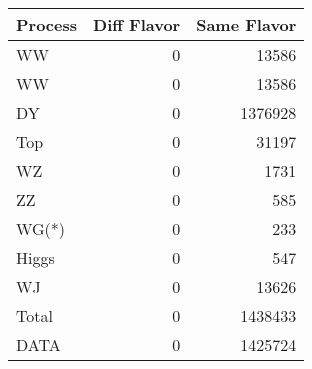 \begin{table}[ht]
	\centering
\begin{tabular}{lrr}

Process &  Diff Flavor &  Same Flavor \\
		\hline
     WW &            0 &        13586 \\
     WW &            0 &        13586 \\
     DY &            0 &      1376928 \\
    Top &            0 &        31197 \\
     WZ &            0 &         1731 \\
     ZZ &            0 &          585 \\
  WG(*) &            0 &          233 \\
  Higgs &            0 &          547 \\
     WJ &            0 &        13626 \\
\hline
  Total &            0 &      1438433 \\
   DATA &            0 &      1425724 \\


\end{tabular}

\end{table}